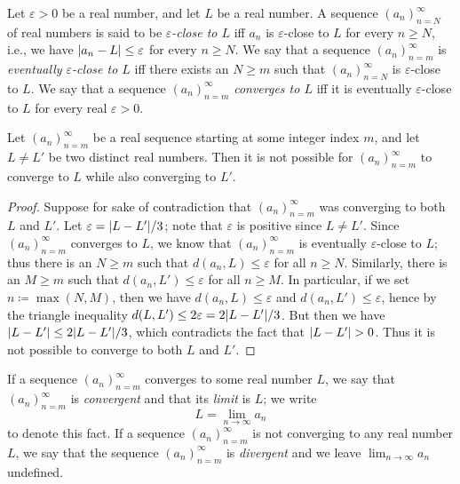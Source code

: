 \begin{definition}\label{6.1.5}
    Let \(\varepsilon > 0\) be a real number, and let \(L\) be a real number.
    A sequence \((a_n)_{n = N}^\infty\) of real numbers is said to be \emph{\(\varepsilon\)-close to \(L\)} iff \(a_n\) is \(\varepsilon\)-close to \(L\) for every \(n \geq N\), i.e., we have \(\abs*{a_n - L} \leq \varepsilon\) for every \(n \geq N\).
    We say that a sequence \((a_n)_{n = m}^\infty\) is \emph{eventually \(\varepsilon\)-close to \(L\)} iff there exists an \(N \geq m\) such that \((a_n)_{n = N}^\infty\) is \(\varepsilon\)-close to \(L\).
    We say that a sequence \((a_n)_{n = m}^\infty\) \emph{converges to \(L\)} iff it is eventually \(\varepsilon\)-close to \(L\) for every real \(\varepsilon > 0\).
\end{definition}

\setcounter{theorem}{6}
\begin{proposition}\label{6.1.7}
    Let \((a_n)_{n = m}^\infty\) be a real sequence starting at some integer index \(m\), and let \(L \neq L'\) be two distinct real numbers.
    Then it is not possible for \((a_n)_{n = m}^\infty\) to converge to \(L\) while also converging to \(L'\).
\end{proposition}

\begin{proof}
    Suppose for sake of contradiction that \((a_n)_{n = m}^\infty\) was converging to both \(L\) and \(L'\).
    Let \(\varepsilon = \abs*{L - L'} / 3\);
    note that \(\varepsilon\) is positive since \(L \neq L'\).
    Since \((a_n)_{n = m}^\infty\) converges to \(L\), we know that \((a_n)_{n = m}^\infty\) is eventually \(\varepsilon\)-close to \(L\);
    thus there is an \(N \geq m\) such that \(d(a_n, L) \leq \varepsilon\) for all \(n \geq N\).
    Similarly, there is an \(M \geq m\) such that \(d(a_n, L') \leq \varepsilon\) for all \(n \geq M\).
    In particular, if we set \(n \coloneqq \max(N, M)\), then we have \(d(a_n, L) \leq \varepsilon\) and \(d(a_n, L') \leq \varepsilon\), hence by the triangle inequality \(d(L, L') \leq 2\varepsilon = 2\abs*{L - L'} / 3\).
    But then we have \(\abs*{L - L'} \leq 2\abs*{L - L'} / 3\), which contradicts the fact that \(\abs*{L - L'} > 0\).
    Thus it is not possible to converge to both \(L\) and \(L'\).
\end{proof}

\begin{definition}\label{6.1.8}
    If a sequence \((a_n)_{n = m}^\infty\) converges to some real number \(L\), we say that \((a_n)_{n = m}^\infty\) is \emph{convergent} and that its \emph{limit} is \(L\);
    we write
    \[
        L = \lim_{n \to \infty} a_n
    \]
    to denote this fact.
    If a sequence \((a_n)_{n = m}^\infty\) is not converging to any real number \(L\), we say that the sequence \((a_n)_{n = m}^\infty\) is \emph{divergent} and we leave \(\lim_{n \to \infty} a_n\) undefined.
\end{definition}

